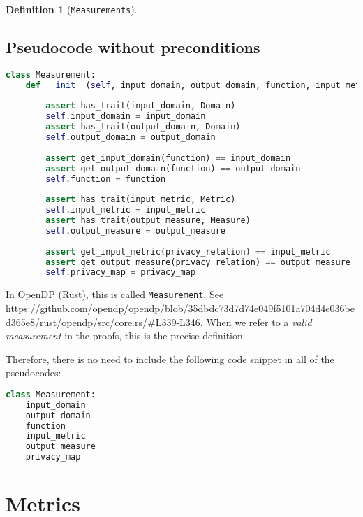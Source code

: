 \documentclass[11pt,a4paper]{article}
\theoremstyle{definition}
\newtheorem{definition}[theorem]{Definition}
\newcommand{\inOpenDPRust}[2]{In OpenDP (Rust), this is called \texttt{#1}. See \url{#2}.}
\begin{document}
\begin{definition}[\texttt{Measurements}]
\subsection{Pseudocode without preconditions}
\label{sec:pseudocode-wout-preconditions}
\begin{lstlisting}[language=Python]
class Measurement:
    def __init__(self, input_domain, output_domain, function, input_metric, output_measure, privacy_map):
        
        assert has_trait(input_domain, Domain)
        self.input_domain = input_domain
        assert has_trait(output_domain, Domain)
        self.output_domain = output_domain
        
        assert get_input_domain(function) == input_domain
        assert get_output_domain(function) == output_domain
        self.function = function
        
        assert has_trait(input_metric, Metric)
        self.input_metric = input_metric
        assert has_trait(output_measure, Measure)
        self.output_measure = output_measure
        
        assert get_input_metric(privacy_relation) == input_metric
        assert get_output_measure(privacy_relation) == output_measure
        self.privacy_map = privacy_map
\end{lstlisting}
    
    \inOpenDPRust{Measurement}{https://github.com/opendp/opendp/blob/35dbdc73d7d74e049f5101a704d4e036bed365e8/rust/opendp/src/core.rs/#L339-L346} When we refer to a \textit{valid measurement} in the proofs, this is the precise definition.
\end{definition}
Therefore, there is no need to include the following code snippet in all of the pseudocodes:
\begin{lstlisting}[language=Python]
class Measurement:
    input_domain
    output_domain
    function
    input_metric
    output_measure
    privacy_map 
\end{lstlisting}
\section{Metrics}
\label{sec:metrics}
\end{document}

